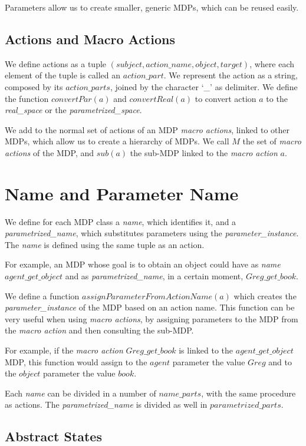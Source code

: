 Parameters allow us to create smaller, generic MDPs, which can be reused easily.


\subsection{Actions and Macro Actions}
We define actions as a tuple $(subject,action\_name,object,target)$, where each element of the tuple is called an $action\_part$.  We represent the action as a string, composed by its $action\_parts$, joined by the character `\_' as delimiter. We define the function $convertPar(a)$ and $convertReal(a)$ to convert action $a$ to the \textit{real\_space} or the \textit{parametrized\_space}.

We add to the normal set of actions of an MDP \textit{macro actions}, linked to other MDPs, which allow us to create a hierarchy of MDPs. We call $M$ the set of \textit{macro actions} of the MDP, and $sub(a)$ the sub-MDP linked to the \textit{macro action} $a$.

\section{Name and Parameter Name}
We define for each MDP class a \textit{name}, which identifies it, and a \textit{parametrized\_name}, which substitutes parameters using the \textit{parameter\_instance}. The \textit{name} is defined using the same tuple as an action. 

For example, an MDP whose goal is to obtain an object could have as \textit{name} $agent\_get\_object$ and as \textit{parametrized\_name}, in a certain moment, $Greg\_get\_book$.

We define a function $assignParameterFromActionName(a)$ which creates the \textit{parameter\_instance} of the MDP based on an action name. This function can be very useful when using \textit{macro actions}, by assigning parameters to the MDP from the \textit{macro action} and then consulting the sub-MDP.

For example, if the \textit{macro action} $Greg\_get\_book$ is linked to the $agent\_get\_object$ MDP, this function would assign to the $agent$ parameter the value $Greg$ 
and to the $object$ parameter the value $book$.

Each \textit{name} can be divided in a number of $name\_parts$,  with the same procedure as actions. The \textit{parametrized\_name} is divided as well in $parametrized\_parts$.


\subsection{Abstract States}

